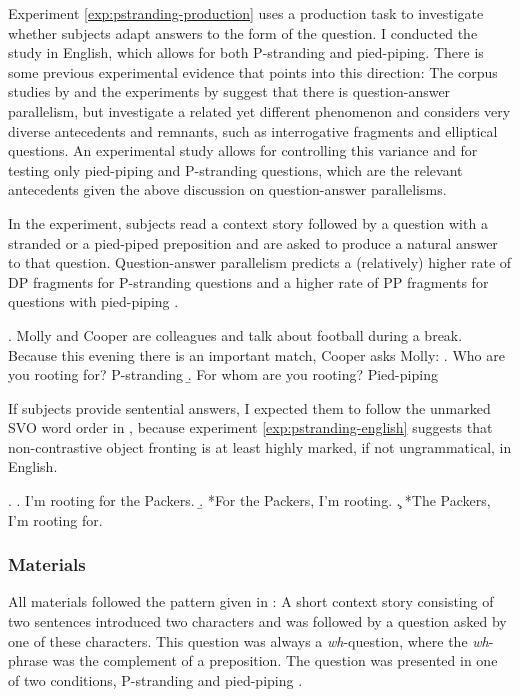 Experiment \ref{exp:pstranding-production} uses a production task to investigate whether subjects adapt answers to the form of the question. I conducted the study in English, which allows for both P-stranding and pied-piping. There is some previous experimental evidence that points into this direction: The corpus studies by \citet{nykiel2014, nykiel2017} and the experiments by \citet{levelt.kelter1982} suggest that there is question-answer parallelism, but \citet{levelt.kelter1982} investigate a related yet different phenomenon and \citet{nykiel2014, nykiel2017} considers very diverse antecedents and remnants, such as interrogative fragments and elliptical questions. An experimental study allows for controlling this variance and for testing only pied-piping and P-stranding questions, which are the relevant antecedents given the above discussion on question-answer parallelisms.

In the experiment, subjects read a context story followed by a question with a stranded \Next[a] or a pied-piped \Next[b] preposition and are asked to produce a natural answer to that question. Question-answer parallelism predicts a (relatively) higher rate of DP fragments for P-stranding questions \Next[a] and a higher rate of PP fragments for questions with pied-piping \Next[b]. 

\newpage
\ex. Molly and Cooper are colleagues and talk about football during a break. Because this evening there is an important match, Cooper asks Molly:
\a. Who are you rooting for? \hfill P-stranding
\b. For whom are you rooting? \hfill Pied-piping

If subjects provide sentential answers, I expected them to follow the unmarked SVO word order in \Next[a], because experiment \ref{exp:pstranding-english} suggests that non-con\-tras\-tive object fronting \Next[b,c] is at least highly marked, if not ungrammatical, in English.

\ex. \a. I'm rooting for the Packers.
     \b. *For the Packers, I'm rooting.
     \c. *The Packers, I'm rooting for.

\subsubsection{Materials}
All materials followed the pattern given in \LLast: A short context story consisting of two sentences introduced two characters and was followed by a question asked by one of these characters. This question was always a \textit{wh}-question, where the \textit{wh}-phrase was the complement of a preposition. The question was presented in one of two conditions, P-stranding \LLast[a] and pied-piping \LLast[b]. %

